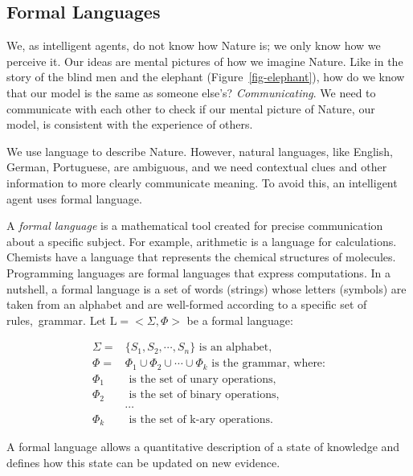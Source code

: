 \documentclass[
  letterpaper,
  12pt,
  british]{tufte-book}
\theoremstyle{plain}
\theoremstyle{definition}
\theoremstyle{plain}
\theoremstyle{remark}
\begin{document}
\hypertarget{sec-formal_language}{%
\subsection{Formal Languages}\label{sec-formal_language}}

We, as intelligent agents, do not know how Nature is; we only know how
we perceive it. Our ideas are mental pictures of how we imagine Nature.
Like in the story of the blind men and the elephant
(Figure~\ref{fig-elephant}), how do we know that our model is the same
as someone else's? \emph{Communicating}. We need to communicate with
each other to check if our mental picture of Nature, our model, is
consistent with the experience of others.

We use language to describe Nature. However, natural languages, like
English, German, Portuguese, are ambiguous, and we need contextual clues
and other information to more clearly communicate meaning. To avoid
this, an intelligent agent uses formal language.

A \emph{formal language} is a mathematical tool created for precise
communication about a specific subject. For example, arithmetic is a
language for calculations. Chemists have a language that represents the
chemical structures of molecules. Programming languages are formal
languages that express computations. In a nutshell, a formal language is
a set of words (strings) whose letters (symbols) are taken from an
alphabet and are well-formed according to a specific set of
rules,~grammar. Let \(\mathrm{L}= <\Sigma, \Phi>\) be a formal language:

\begin{align}
    \Sigma =& \{S_1, S_2, \cdots, S_n\} \text{ is an alphabet,}\\
    \Phi =& {\Phi_1 \cup \Phi_2 \cup \cdots \cup \Phi_k} \text{ is the grammar, where:}\\
    \Phi_1 &\text{ is the set of unary operations}, \nonumber\\
    \Phi_2 &\text{ is the set of binary operations}, \nonumber\\
    &\cdots \nonumber \\
    \Phi_k &\text{ is the set of k-ary operations.}\nonumber
\end{align}

A formal language allows a quantitative description of a state of
knowledge and defines how this state can be updated on new
evidence.
\end{document}
